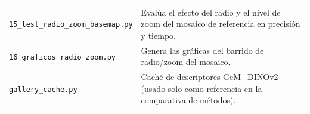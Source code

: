 \begin{longtable}{p{}p{}}
\texttt{15\_test\_radio\_zoom\_\newline basemap.py} & Evalúa el efecto del radio y el nivel de zoom del mosaico de referencia en precisión y tiempo. \\
\texttt{16\_graficos\_radio\_\newline zoom.py} & Genera las gráficas del barrido de radio/zoom del mosaico. \\
\texttt{gallery\_cache.py} & Caché de descriptores GeM+DINOv2 (usado solo como referencia en la comparativa de métodos). \\
\bottomrule
\end{longtable}

